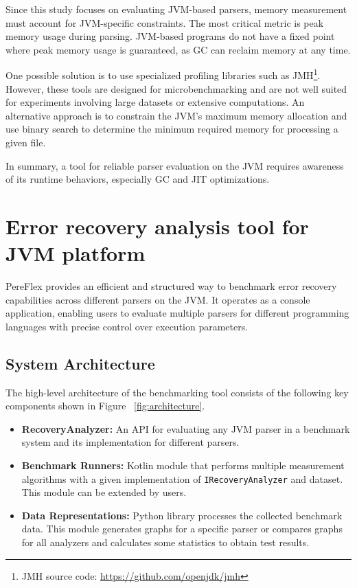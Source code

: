 \documentclass[conference]{IEEEtran}
\begin{document}
Since this study focuses on evaluating JVM-based parsers, memory measurement must account for JVM-specific constraints. The most critical metric is peak memory usage during parsing. JVM-based programs do not have a fixed point where peak memory usage is guaranteed, as GC can reclaim memory at any time.



One possible solution is to use specialized profiling libraries such as JMH\footnote{JMH source code: \url{https://github.com/openjdk/jmh}}. However, these tools are designed for microbenchmarking and are not well suited for experiments involving large datasets or extensive computations. An alternative approach is to constrain the JVM's maximum memory allocation and use binary search to determine the minimum required memory for processing a given file.

In summary, a tool for reliable parser evaluation on the JVM requires awareness of its runtime behaviors, especially GC and JIT optimizations. 


\section{Error recovery analysis tool for JVM platform}
PereFlex provides an efficient and structured way to benchmark error recovery capabilities across different parsers on the JVM. It operates as a console application, enabling users to evaluate multiple parsers for different programming languages with precise control over execution parameters.

\subsection{System Architecture}
The high-level architecture of the benchmarking tool consists of the following key components shown in Figure ~\ref{fig:architecture}.

\begin{figure*}[htbp]

\caption{High-level architecture of the benchmarking tool.}
\label{fig:architecture}
\end{figure*}

\begin{itemize}
    \item \textbf{RecoveryAnalyzer:} An API for evaluating any JVM parser in a benchmark system and its implementation for different parsers.
    
    \item \textbf{Benchmark Runners:} Kotlin module that performs multiple measurement algorithms with a given implementation of \texttt{IRecoveryAnalyzer} and dataset. This module can be extended by users.
    
    \item \textbf{Data Representations:} Python library processes the collected benchmark data. This module generates graphs for a specific parser or compares graphs for all analyzers and calculates some statistics to obtain test results.
    
\end{itemize}
\end{document}
